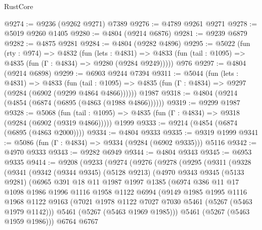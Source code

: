 \begin{lexlean}{RustCore}
\begin{coremodule}
@9274 := @9236 (@9262 @9271) @7389
@9276 := @4789 @9261 @9271
@9278 := @5019 @9260 @1405
@9280 := @4804 (@9214 @6876)
@9281 := @9239 @6879
@9282 := @4875 @9281
@9284 := @4804 (@9282 @4896)
@9295 := @5022
    (fun (rty : @974) =>
    @4832
      (fun (lets : @4831) =>
      @4833 (fun (tail : @1095) => @4835 (fun (Γ : @4834) => @9280 (@9284 @9249)))))
    @976
@9297 := @4804 (@9214 @6898)
@9299 := @6903 @9244 @7394
@9311 := @5044
    (fun (lets : @4831) =>
    @4833
      (fun (tail : @1095) => @4835 (fun (Γ : @4834) => @9297 (@9284 (@6902 (@9299 @4864 @4866))))))
    @1987
@9318 := @4804 (@9214 (@4854 (@6874 (@6895 (@4863 (@1988 @4866))))))
@9319 := @9299 @1987
@9328 := @5068
    (fun (tail : @1095) => @4835 (fun (Γ : @4834) => @9318 (@9284 (@6902 (@9319 @4866)))))
    @1999
@9333 := @9214 (@4854 (@6874 (@6895 (@4863 @2000))))
@9334 := @4804 @9333
@9335 := @9319 @1999
@9341 := @5086 (fun (Γ : @4834) => @9334 (@9284 (@6902 @9335))) @5116
@9342 := @4970 @9333
@9343 := @9282 @6949
@9344 := @4804 @9343
@9345 := @6953 @9335
@9414 := @9208
    (@9233
      (@9274
        (@9276
          (@9278
            (@9295
              (@9311
                (@9328
                  (@9341
                    (@9342
                      (@9344 @9345)
                      (@5128 @9213)
                      (@4970
                        @9343
                        @9345
                        (@5133 @9281)
                        (@6965
                          @391
                          @18
                          @11
                          @1987
                          @1997
                          @1385
                          (@6974
                            @386
                            @11
                            @17
                            @1098
                            @1986
                            @1996
                            @1116
                            @1958
                            @1122
                            @6994
                            (@9149
                              @1985
                              @1995
                              @1116
                              @1968
                              @1122
                              @9163
                              (@7021 @1978 @1122 @7027 @7030 @5461 (@5267 (@5463 @1979 @1142)))
                              @5461
                              (@5267 (@5463 @1969 @1985)))
                            @5461
                            (@5267 (@5463 @1959 @1986)))
                          @6764
                          @6767

\end{coremodule}
\end{lexlean}
